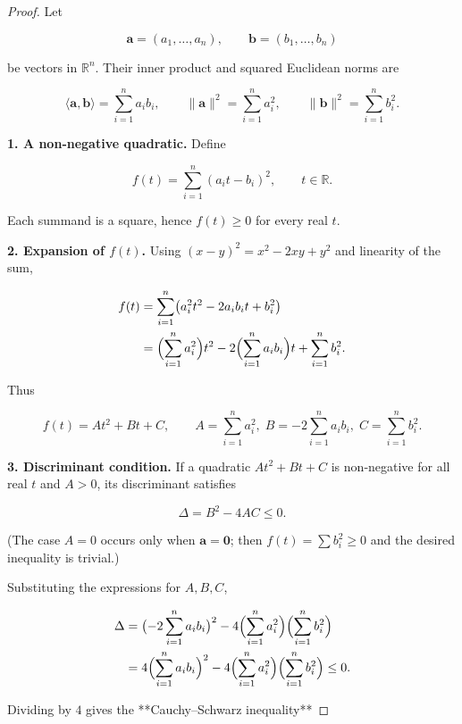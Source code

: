 \begin{proof}
Let  

\[
\mathbf a=(a_{1},\dots ,a_{n}),\qquad 
\mathbf b=(b_{1},\dots ,b_{n})
\]

be vectors in \(\mathbb{R}^{n}\).  
Their inner product and squared Euclidean norms are  

\[
\langle\mathbf a,\mathbf b\rangle=\sum_{i=1}^{n}a_{i}b_{i},\qquad 
\|\mathbf a\|^{2}= \sum_{i=1}^{n}a_{i}^{2},\qquad 
\|\mathbf b\|^{2}= \sum_{i=1}^{n}b_{i}^{2}.
\]

\medskip
\textbf{1. A non‑negative quadratic.}  
Define  

\[
f(t)=\sum_{i=1}^{n}(a_{i}t-b_{i})^{2},\qquad t\in\mathbb R .
\]

Each summand is a square, hence \(f(t)\ge 0\) for every real \(t\).

\medskip
\textbf{2. Expansion of \(f(t)\).}  
Using \((x-y)^{2}=x^{2}-2xy+y^{2}\) and linearity of the sum,

\begin{align*}
f(t)
&=\sum_{i=1}^{n}\bigl(a_{i}^{2}t^{2}-2a_{i}b_{i}t+b_{i}^{2}\bigr)\\
&=\Bigl(\sum_{i=1}^{n}a_{i}^{2}\Bigr)t^{2}
   -2\Bigl(\sum_{i=1}^{n}a_{i}b_{i}\Bigr)t
   +\sum_{i=1}^{n}b_{i}^{2}.
\end{align*}

Thus  

\[
f(t)=At^{2}+Bt+C,\qquad 
A=\sum_{i=1}^{n}a_{i}^{2},\;
B=-2\sum_{i=1}^{n}a_{i}b_{i},\;
C=\sum_{i=1}^{n}b_{i}^{2}.
\]

\medskip
\textbf{3. Discriminant condition.}  
If a quadratic \(At^{2}+Bt+C\) is non‑negative for all real \(t\) and \(A>0\), its discriminant satisfies  

\[
\Delta = B^{2}-4AC\le 0.
\]

(The case \(A=0\) occurs only when \(\mathbf a=\mathbf 0\); then \(f(t)=\sum b_{i}^{2}\ge0\) and the desired inequality is trivial.)

Substituting the expressions for \(A,B,C\),

\begin{align*}
\Delta
&= \bigl(-2\sum_{i=1}^{n}a_{i}b_{i}\bigr)^{2}
   -4\Bigl(\sum_{i=1}^{n}a_{i}^{2}\Bigr)\Bigl(\sum_{i=1}^{n}b_{i}^{2}\Bigr)\\
&= 4\Bigl(\sum_{i=1}^{n}a_{i}b_{i}\Bigr)^{2}
   -4\Bigl(\sum_{i=1}^{n}a_{i}^{2}\Bigr)\Bigl(\sum_{i=1}^{n}b_{i}^{2}\Bigr)\le 0 .
\end{align*}

Dividing by \(4\) gives the **Cauchy–Schwarz inequality**


\end{proof}
